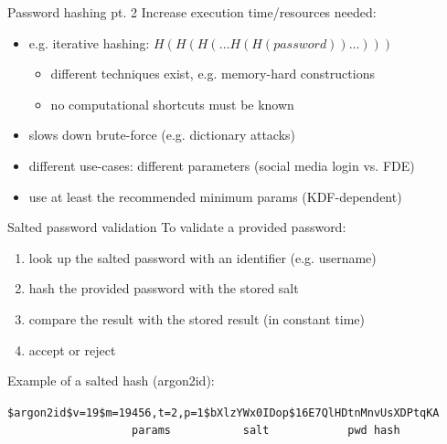\begin{frame}{Password hashing pt. 2}
  Increase execution time/resources needed:
  \begin{itemize}[<+(1)->]
    \item e.g. iterative hashing: $H(H(H(\dots H(H(\mathit{password}))\dots)))$
    \begin{itemize}
      \item different techniques exist, e.g. memory-hard constructions
      \item no computational shortcuts must be known
    \end{itemize}
    \item slows down brute-force (e.g. dictionary attacks)
    \item different use-cases: different parameters (social media login vs. FDE)
    \item use at least the recommended minimum params (KDF-dependent)
  \end{itemize}
\end{frame}

\begin{frame}[fragile]{Salted password validation}
  To validate a provided password:
  \begin{enumerate}[<+(1)->]
    \item look up the salted password with an identifier (e.g. username)
    \item hash the provided password with the stored salt
    \item compare the result with the stored result (in constant time)
    \item accept or reject
  \end{enumerate}

  \vspace*{1em}

  \pause
  Example of a salted hash (argon2id):
  \vspace*{-1em}
  \begin{center}
    \texttt{\$argon2id\$v=19\${\color{Melon}m=19456,t=2,p=1}\${\color{CadetBlue}bXlzYWx0IDop}\${\color{PineGreen}16E7QlHDtnMnvUsXDPtqKA}}\\
    \texttt{%
    \ \ \ \ \ \ \ \ \ \ \ \ \ \ \ \ %
    \ {\color{Melon}params}\ \ \ \ \ %
    \ \ \ \ \ {\color{CadetBlue}salt}\ \ \ \ \ %
    \ \ \ \ \ \ {\color{PineGreen}pwd hash}%
    \ \ \ \ \ \ \ }
  \end{center}
\end{frame}

